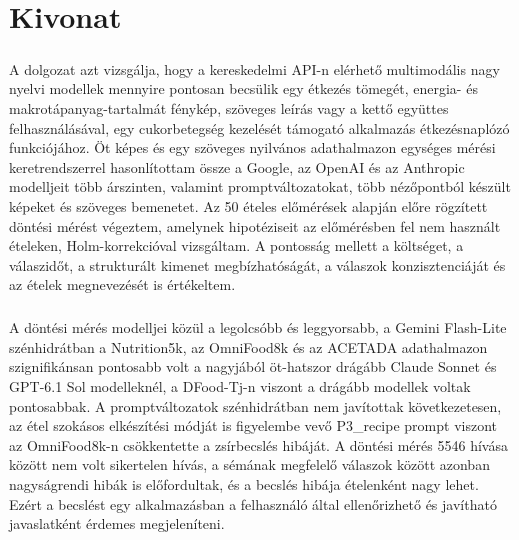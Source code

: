 \chapter*{Kivonat}
\paragraph{}A dolgozat azt vizsgálja, hogy a kereskedelmi API-n elérhető multimodális nagy nyelvi 
modellek mennyire pontosan becsülik egy étkezés tömegét, energia- és makrotápanyag-tartalmát 
fénykép, szöveges leírás vagy a kettő együttes felhasználásával, egy cukorbetegség kezelését támogató alkalmazás 
étkezésnaplózó funkciójához. Öt képes és egy szöveges nyilvános adathalmazon egységes mérési 
keretrendszerrel hasonlítottam össze a Google, az OpenAI és az Anthropic modelljeit több árszinten, 
valamint promptváltozatokat, több nézőpontból készült képeket és szöveges bemenetet. Az 50 ételes 
előmérések alapján előre rögzített döntési mérést végeztem, amelynek hipotéziseit az előmérésben 
fel nem használt ételeken, Holm-korrekcióval vizsgáltam. A pontosság mellett a költséget, a 
válaszidőt, a strukturált kimenet megbízhatóságát, a válaszok konzisztenciáját és az ételek 
megnevezését is értékeltem.

\paragraph{}A döntési mérés modelljei közül a legolcsóbb és leggyorsabb, a Gemini Flash-Lite szénhidrátban a 
Nutrition5k, az OmniFood8k és az ACETADA adathalmazon szignifikánsan pontosabb volt a nagyjából 
öt-hatszor drágább Claude Sonnet és GPT-6.1 Sol modelleknél, a DFood-Tj-n viszont a drágább modellek 
voltak pontosabbak. A promptváltozatok szénhidrátban nem javítottak következetesen, az étel szokásos 
elkészítési módját is figyelembe vevő P3\_recipe prompt viszont az OmniFood8k-n csökkentette a 
zsírbecslés hibáját. A döntési mérés 5546 hívása között nem volt sikertelen hívás, a sémának 
megfelelő válaszok között azonban nagyságrendi hibák is előfordultak, és a becslés hibája 
ételenként nagy lehet. Ezért a becslést egy alkalmazásban a felhasználó által ellenőrizhető és 
javítható javaslatként érdemes megjeleníteni.
\clearpage
